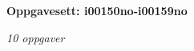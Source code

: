 \centerline{\bf Oppgavesett: i00150no-i00159no}
\vskip 10pt
\centerline{\it 10 oppgaver}\vskip 10pt
\vskip 10pt
